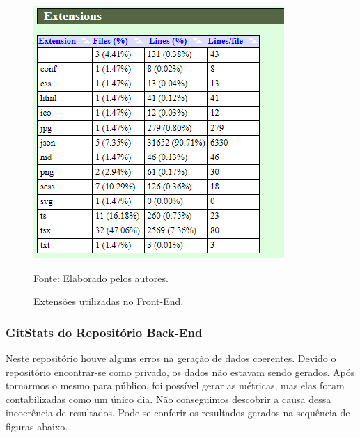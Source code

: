 \documentclass[
    12pt,               %
    openright,          %
    oneside,
    a4paper,            %
    BIBLATEX,           %
    TODO,               %
    english,            %
    brazil              %
    ]{ifsp-spo-inf-ctds}
\begin{document}
    \begin{figure}[H]
                \centering
                \caption{Extensões utilizadas no Front-End.}
                \includegraphics[scale = 1.2]{Gitstats/front-end/ListadeExtensoes.png}
                
                {\footnotesize Fonte: Elaborado pelos autores.}
                \label{fig:extensaoFront}
            \end{figure}
    
    
    
\subsubsection{GitStats do Repositório Back-End}

    Neste repositório houve alguns erros na geração de dados coerentes. Devido o repositório encontrar-se como privado, os dados não estavam sendo gerados. Após tornarmos o mesmo para público, foi possível gerar as métricas, mas elas foram contabilizadas como um único dia. Não conseguimos descobrir a causa dessa incoerência de resultados. 
    Pode-se conferir os resultados gerados na sequência de figuras abaixo.
    
\end{document}
